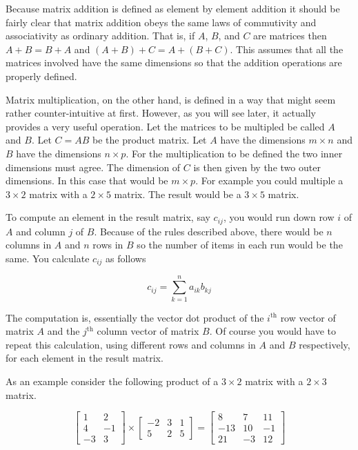 Because matrix addition is defined as element by element addition it should be fairly clear that
matrix addition obeys the same laws of commutivity and associativity as ordinary addition. That
is, if $A$, $B$, and $C$ are matrices then $A + B = B + A$ and $(A + B) + C = A + (B + C)$. This
assumes that all the matrices involved have the same dimensions so that the addition operations
are properly defined.

Matrix multiplication, on the other hand, is defined in a way that might seem rather
counter-intuitive at first. However, as you will see later, it actually provides a very useful
operation. Let the matrices to be multipled be called $A$ and $B$. Let $C = AB$ be the product
matrix. Let $A$ have the dimensions $m \times n$ and $B$ have the dimensions $n \times p$. For
the multiplication to be defined the two inner dimensions must agree. The dimension of $C$ is
then given by the two outer dimensions. In this case that would be $m \times p$. For example you
could multiple a $3 \times 2$ matrix with a $2 \times 5$ matrix. The result would be a $3 \times
5$ matrix.

To compute an element in the result matrix, say $c_{ij}$, you would run down row $i$ of $A$ and
column $j$ of $B$. Because of the rules described above, there would be $n$ columns in $A$ and
$n$ rows in $B$ so the number of items in each run would be the same. You calculate $c_{ij}$ as
follows

\begin{displaymath}
c_{ij} = \sum_{k = 1}^{n} a_{ik} b_{kj}
\end{displaymath}

The computation is, essentially the vector dot product of the $i^{\mathrm{th}}$ row vector of
matrix $A$ and the $j^{\mathrm{th}}$ column vector of matrix $B$. Of course you would have to
repeat this calculation, using different rows and columns in $A$ and $B$ respectively, for each
element in the result matrix.

As an example consider the following product of a $3 \times 2$ matrix with a $2 \times 3$
matrix.

\begin{displaymath}
\left[
\begin{array}{rr}
 1  &  2 \\
 4  & -1 \\
-3  &  3
\end{array}
\right] \times
\left[
\begin{array}{rrr}
-2 & 3 & 1 \\
 5 & 2 & 5
\end{array}
\right] =
\left[
\begin{array}{rrr}
   8 &  7 & 11 \\
 -13 & 10 & -1 \\
  21 & -3 & 12 
\end{array}
\right]
\end{displaymath}

